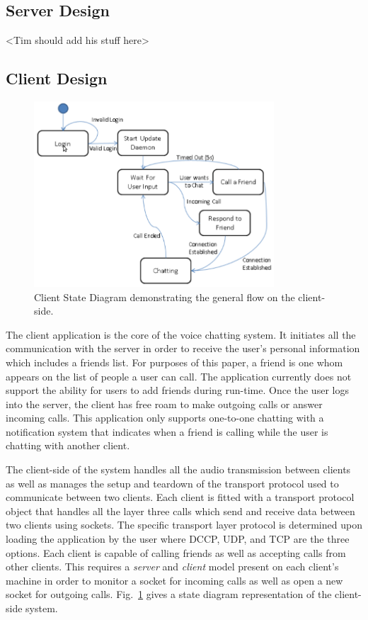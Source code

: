 \documentclass[letterpaper, 9 pt, balance, conference]{ieeeconf}
\begin{document}
\subsection{Server Design}
\label{subsec:server_des}

<Tim should add his stuff here>

\subsection{Client Design}
\label{subsec:client_des}

\begin{figure}[!t]
   \centering
      \includegraphics[width=0.8\textwidth]{pics/Client_StateDiagram}
   \caption{Client State Diagram demonstrating the general flow on the client-side.}
\label{fig:client_state_diag}
\end{figure}

The client application is the core of the voice chatting system.  It initiates all
the communication with the server in order to receive the user's personal 
information which includes a friends list. For purposes of this paper, a friend
is one whom appears on the list of people a user can call. The application currently
does not support the ability for users to add friends during run-time.  Once the 
user logs into the server,
the client has free roam to make outgoing calls or answer incoming calls.  This
application only supports one-to-one chatting with a notification system that 
indicates when a friend is calling while the user is chatting with another client.  

The client-side of the system handles all the audio transmission between clients
as well as manages the setup and teardown of the transport protocol used to
communicate between two clients.  Each client is fitted with a transport protocol
object that handles all the layer three calls which send and receive data between
two clients using sockets.  The specific transport layer protocol is determined
upon loading the application by the user where DCCP, UDP, and TCP are the three
options. Each client is capable of calling friends as well as accepting calls from
other clients.  This requires a \textit{server} and \textit{client} model present
on each client's machine in order to monitor a socket for incoming calls as well
as open a new socket for outgoing calls.  Fig.~\ref{fig:client_state_diag} gives 
a state diagram representation of the client-side system.
\end{document}
